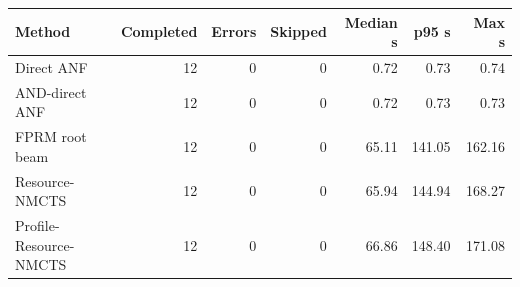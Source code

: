 \begin{tabular}{lrrrrrr}
\toprule
Method & Completed & Errors & Skipped & Median s & p95 s & Max s \\
\midrule
Direct ANF & 12 & 0 & 0 & 0.72 & 0.73 & 0.74 \\
AND-direct ANF & 12 & 0 & 0 & 0.72 & 0.73 & 0.73 \\
FPRM root beam & 12 & 0 & 0 & 65.11 & 141.05 & 162.16 \\
Resource-NMCTS & 12 & 0 & 0 & 65.94 & 144.94 & 168.27 \\
Profile-Resource-NMCTS & 12 & 0 & 0 & 66.86 & 148.40 & 171.08 \\
\bottomrule
\end{tabular}
